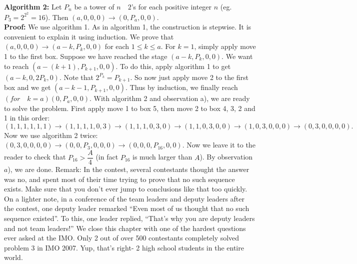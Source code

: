 \documentclass[a4paper,11pt]{book}
\begin{document}
\textbf{ Algorithm 2:} Let $P_n$ be a tower of $n\quad 2’$s for each positive integer $n$
(eg. $P_3 = 2^{2^{2}} = 16$). Then
$(a, 0, 0, 0) \rightarrow (0, P_a, 0, 0)$.\\
\textbf{Proof: } We use algorithm 1. As in algorithm 1, the construction is
stepwise. It is convenient to explain it using induction.
We prove that $(a, 0, 0, 0) \rightarrow(a-k, P_k, 0, 0)$ for each $1 \le k \le a$. For
$k = 1$, simply apply move 1 to the first box. Suppose we have
reached the stage $(a-k, P_k, 0, 0)$. We want to reach $(a- (k+1), P_{k+1}, 0,
0)$. To do this, apply algorithm 1 to get $(a-k, 0, 2P_k, 0)$. Note that
$2^{P_k} = P_{k+1}$. So now just apply move 2 to the first box and we get $(a-k-1, P_{k+1}, 0, 0)$. Thus by induction, we finally reach $(for \quad k = a) (0, P_a,
0, 0).$
With algorithm 2 and observation a), we are ready to solve the
problem.
First apply move 1 to box 5, then move 2 to box 4, 3, 2 and 1 in
this order:\\
$(1, 1, 1, 1, 1, 1) \rightarrow (1, 1, 1, 1, 0, 3) \rightarrow (1, 1, 1, 0, 3, 0) \rightarrow (1, 1, 0, 3, 0,
0) \rightarrow(1, 0, 3, 0, 0, 0) \rightarrow (0, 3, 0, 0, 0, 0).$
Now we use algorithm 2 twice:
$(0, 3, 0, 0, 0, 0) \rightarrow (0, 0, P_3, 0, 0, 0) \rightarrow (0, 0, 0, P_{16}, 0, 0).$
Now we leave it to the reader to check that $P_{16} > \dfrac{A}{4}$ (in fact $P_{16}$
is much larger than $A$). By observation $a$), we are done.
Remark: In the contest, several contestants thought the answer
was no, and spent most of their time trying to prove that no such
sequence exists. Make sure that you don’t ever jump to
conclusions like that too quickly. On a lighter note, in a conference
of the team leaders and deputy leaders after the contest, one
deputy leader remarked “Even most of us thought that no such
sequence existed”. To this, one leader replied, “That’s why you are
deputy leaders and not team leaders!”
We close this chapter with one of the hardest questions ever
asked at the IMO. Only 2 out of over 500 contestants completely
solved problem 3 in IMO 2007. Yup, that’s right- 2 high school
students in the entire world.\\
\end{document}
